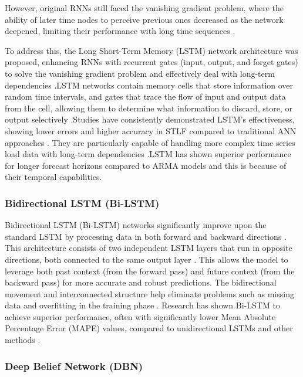  However, original RNNs still faced the vanishing gradient problem, where the ability of later time nodes to perceive previous ones decreased as the network deepened, limiting their performance with long time sequences \cite{wang2018short}.
 
 To address this, the Long Short-Term Memory (LSTM) network architecture was proposed, enhancing RNNs with recurrent gates (input, output, and forget gates) to solve the vanishing gradient problem and effectively deal with long-term dependencies \cite{wang2023short}.LSTM networks contain memory cells that store information over random time intervals, and gates that trace the flow of input and output data from the cell, allowing them to determine what information to discard, store, or output selectively \cite{he2019hybrid}.Studies have consistently demonstrated LSTM's effectiveness, showing lower errors and higher accuracy in STLF compared to traditional ANN approaches \cite{ahmed2020review}\cite{boopathy2024deep}. They are particularly capable of handling more complex time series load data with long-term dependencies \cite{rafi2021short}.LSTM has shown superior performance for longer forecast horizons compared to ARMA models \cite{tshipata2024multi} and this is because of their temporal capabilities.
 
 \subsubsection{Bidirectional LSTM (Bi-LSTM)}

 Bidirectional LSTM (Bi-LSTM) networks significantly improve upon the standard LSTM by processing data in both forward and backward directions \cite{wang2023short}. This architecture consists of two independent LSTM layers that run in opposite directions, both connected to the same output layer \cite{moradzadeh2021deep}. This allows the model to leverage both past context (from the forward pass) and future context (from the backward pass) for more accurate and robust predictions. The bidirectional movement and interconnected structure help eliminate problems such as missing data and overfitting in the training phase \cite{moradzadeh2021deep}. Research has shown Bi-LSTM to achieve superior performance, often with significantly lower Mean Absolute Percentage Error (MAPE) values, compared to unidirectional LSTMs and other methods \cite{ibrahim2022machine}.
 
 \subsubsection{Deep Belief Network (DBN)}

